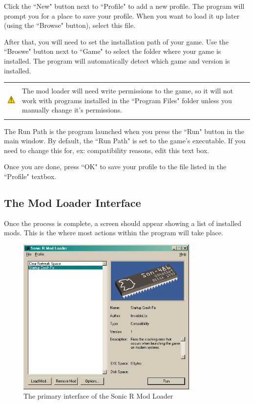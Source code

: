 \documentclass[12pt,a4paper,notitlepage]{article}
\newcommand{\warning}[1]{
    \begin{tabular}{m{1.1cm}  m{11cm}}
    &\\
    \includegraphics[width=1.1cm, height=1.1cm]{warning} & #1
    \\&\\
    \end{tabular}
}
\begin{document}
Click the ``New" button next to ``Profile" to add a new profile. The program will prompt you for a place to save your profile. When you want to load it up later (using the ``Browse" button), select this file.

After that, you will need to set the installation path of your game. Use the ``Broswe" button next to ``Game" to select the folder where your game is installed. The program will automatically detect which game and version is installed.

\warning{The mod loader will need write permissions to the game, so it will not work with programs installed in the ``Program Files" folder unless you manually change it's permissions.}

The Run Path is the program launched when you press the ``Run" button in the main window. By default, the ``Run Path" is set to the game's executable.  If you need to change this for, ex: compatibility reasons, edit this text box.

Once you are done, press ``OK" to save your profile to the file listed in the ``Profile" textbox.

\subsection{The Mod Loader Interface}
\label{subsec:using-interface}
Once the process is complete, a screen should appear showing a list of installed mods. This is the where most actions within the program will take place.

\begin{figure}[h]
    \centering
    \includegraphics[width=0.8\textwidth]{interface-3.png}
    \caption{The primary interface of the Sonic R Mod Loader}
    \label{fig:interface}
\end{figure}
\end{document}
